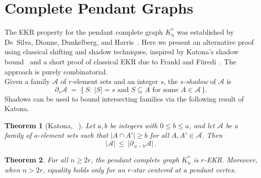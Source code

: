 \documentclass{article}
\newtheorem{theorem}{Theorem}
\theoremstyle{definition}
\newcommand{\A}{\mathcal{A}}
\newcommand{\1}{\mathbf{1}}
\begin{document}

\section{Complete Pendant Graphs}
\label{sec3}

The EKR property for the pendant complete graph $K_n^*$ was established by De~Silva, Dionne, Dunkelberg, and Harris~\cite{DeSilvaDDH2023}. Here we present an alternative proof using classical shifting and shadow techniques, inspired by Katona's shadow bound~\cite{Katona1964} and a short proof of classical EKR due to Frankl and F\"uredi~\cite{FranklFuredi}. The approach is purely combinatorial. \\


\noindent Given a family $\A$ of $r$-element sets and an integer $s$, the \emph{$s$-shadow} of $\A$ is
\[
\partial_s \A \;=\; \{\,S:\ |S|=s \text{ and } S\subseteq A \text{ for some } A\in\A\,\}.
\]
Shadows can be used to bound intersecting families via the following result of Katona.

\begin{theorem}[Katona, ~\cite{Katona1964}]\label{thm:Katona}
Let $a,b$ be integers with $0\le b\le a$, and let $\A$ be a family of $a$-element sets such that
$|A\cap A'|\ge b$ for all $A,A'\in\A$. Then
\[
|\A|\ \le\ |\partial_{\,a-b}\A|\,.
\]
\end{theorem}

\begin{theorem}\label{thm:KnstarEKR}
For all $n \ge 2r$, the pendant complete graph $K_n^*$ is $r$-EKR. Moreover, when $n>2r$, equality holds only for an $r$-star centered at a pendant vertex.
\end{theorem}
\end{document}
